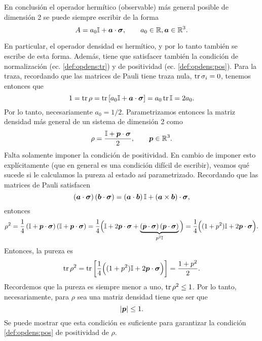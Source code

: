 \documentclass[10pt, a4paper]{article}
\numberwithin{equation}{subsection}
\begin{document}
En conclusión el operador hermítico (observable) más general posible de
dimensión 2 se puede siempre escribir de la forma
\begin{equation}
  A = a_0\mathbb{I} + \vb*{a}\cdot\vb*{\sigma}, \qquad
    a_0\in\mathbb{R},\vb*{a}\in\mathbb{R}^3.
\end{equation}

En particular, el operador densidad es hermítico, y por lo tanto también se
escribe de esta forma. Además, tiene que satisfacer también la condición de
normalización (ec. \eqref{def:opdens:tr}) y de positividad (ec.
\eqref{def:opdens:pos}). Para la traza, recordando que las matrices de Pauli
tiene traza nula, $\tr\sigma_i = 0$, tenemos entonces que
\begin{equation}
  1 = \tr\rho = \tr\left[a_0\mathbb{I} + \vb*{a}\cdot\vb*{\sigma}\right] = a_0\tr\mathbb{I}
  = 2a_0.
\end{equation}
Por lo tanto, necesariamente $a_0 = 1/2$. Parametrizamos entonces la matriz
densidad más general de un sistema de dimensión 2 como
\begin{equation}
  \rho = \frac{\mathbb{I} + \vb*{p}\cdot\vb*{\sigma}}{2}, \qquad
  \vb*{p}\in\mathbb{R}^3.
\end{equation}
Falta solamente imponer la condición de positividad. En cambio de imponer esto
explícitamente (que en general es una condición difícil de escribir), veamos
qué sucede si le calculamos la pureza al estado así parametrizado. Recordando
que las matrices de Pauli satisfacen
\begin{equation}
  \left(\vb*{a}\cdot\vb*{\sigma}\right)
  \left(\vb*{b}\cdot\vb*{\sigma}\right)
  = \left(\vb*{a}\cdot\vb*{b}\right)\mathbb{I} +
  \left(\vb*{a}\times\vb*{b}\right)\cdot\vb*{\sigma},
\end{equation}
entonces
\begin{equation}
  \rho^2
  = \frac{1}{4} \left(\mathbb{I} + \vb*{p}\cdot\vb*{\sigma}\right) \left(\mathbb{I} +
    \vb*{p}\cdot\vb*{\sigma}\right)
  = \frac{1}{4} \Big(\mathbb{I} + 2\vb*{p}\cdot\vb*{\sigma} +
    \underbrace{\left(\vb*{p}\cdot\vb*{\sigma}\right)
    \left(\vb*{p}\cdot\vb*{\sigma}\right)}_{p^2\mathbb{I}} \Big)
  = \frac{1}{4} \Big((1 + p^2)\mathbb{I} + 2\vb*{p}\cdot\vb*{\sigma}\Big).
\end{equation}
Entonces, la pureza es
\begin{equation}
  \tr\rho^2 = \tr\left[
    \frac{1}{4} \Big((1 + p^2)\mathbb{I} + 2\vb*{p}\cdot\vb*{\sigma}\Big)\right]
  = \frac{1 + p^2}{2}.
\end{equation}
Recordemos que la pureza es siempre menor a uno, $\tr\rho^2 \leq 1$. Por lo
tanto, necesariamente, para $\rho$ sea una matriz densidad tiene que ser que
\begin{equation}
  \abs{\vb*{p}} \leq 1.
\end{equation}
Se puede mostrar que esta condición es suficiente para garantizar la condición
\eqref{def:opdens:pos} de positividad de $\rho$.
\end{document}

